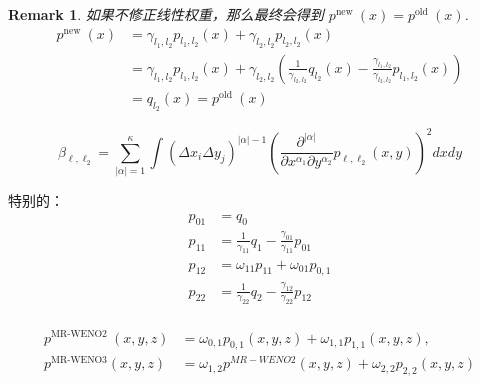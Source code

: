 \documentclass{article}
\newtheorem{remark}{Remark}
\numberwithin{equation}{subsection}    %
\begin{document}
\begin{remark}
    如果不修正线性权重，那么最终会得到 $p^{\text {new }}(x)=p^{\text {old }}(x)$.
    \begin{equation}
        \begin{aligned}
            p^{\text {new }}(x) & =\gamma_{l_1,l_2}p_{l_1,l_2}(x)+\gamma_{l_2,l_2}p_{l_2,l_2}(x)                                                                                            \\
                                & =\gamma_{l_1,l_2}p_{l_1,l_2}(x)+\gamma_{l_2,l_2}\left(\frac{1}{\gamma_{l_2,l_2}}q_{l_2}(x)-\frac{\gamma_{l_1,l_2}}{\gamma_{l_2,l_2}}p_{l_1,l_2}(x)\right) \\
                                & =q_{l_2}(x)=p^{\text {old }}(x)
        \end{aligned}
    \end{equation}
\end{remark}

\begin{equation}
    \beta_{\ell, \ell_{2}}=\sum_{|\alpha|=1}^{\kappa} \int\left(\Delta x_{i} \Delta y_{j}\right)^{|\alpha|-1}\left(\frac{\partial^{|\alpha|}}{\partial x^{\alpha_{1}} \partial y^{\alpha_{2}}} p_{\ell, \ell_{2}}(x, y)\right)^{2} d x d y
\end{equation}


特别的：
\begin{equation}
    \begin{aligned}
        p_{01} & = q_0                                                             \\
        p_{11} & = \frac{1}{\gamma_{11}}q_1-\frac{\gamma_{01}}{\gamma_{11}}p_{01}  \\
        p_{12} & =\omega_{11}p_{11} + \omega_{01}p_{0,1}                           \\
        p_{22} & =\frac{1}{\gamma_{22}}q_2 - \frac{\gamma_{12}}{\gamma_{22}}p_{12} \\
    \end{aligned}
\end{equation}

\begin{equation}
    \begin{aligned}
        p^{\text {MR-WENO2 }}(x, y, z) & =\omega_{0,1} p_{0,1}(x, y, z)+\omega_{1,1} p_{1,1}(x, y, z),          \\
        p^{\text{MR-WENO3}}(x, y, z)   & =\omega_{1,2} p^{M R-W E N O 2}(x, y, z)+\omega_{2,2} p_{2,2}(x, y, z)
    \end{aligned}
\end{equation}
\end{document}
